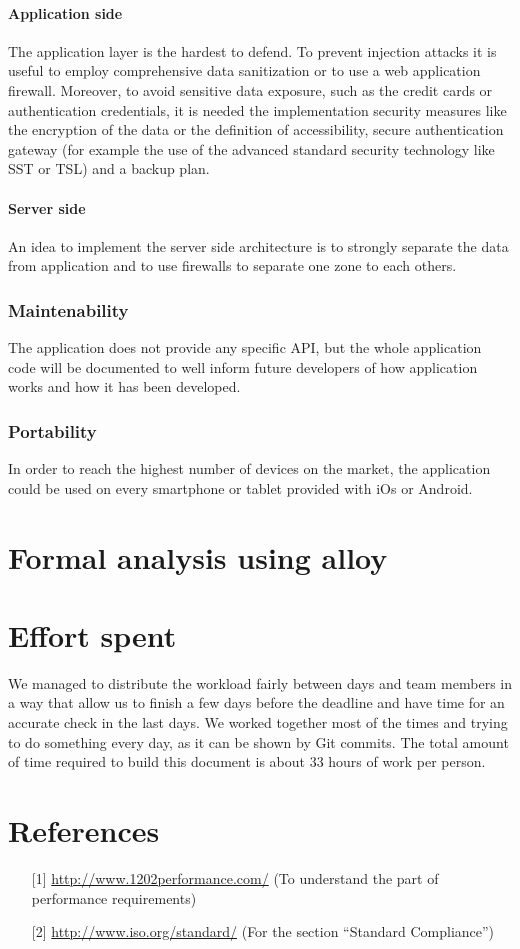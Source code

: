 \documentclass[12pt,titlepage]{article}
\begin{document}
\paragraph{Application side}
The application layer is the hardest to defend. To prevent injection attacks it is useful to employ comprehensive data sanitization or to use a web application firewall. Moreover, to avoid sensitive data exposure, such as the credit cards or authentication credentials, it is needed the implementation security measures like the encryption of the data or the definition of accessibility, secure authentication gateway (for example the use of the advanced standard security technology like SST or TSL) and a backup plan.

\paragraph{Server side}
An idea to implement the server side architecture is to strongly separate the data from application and to use firewalls to separate one zone to each others. 


\subsubsection{Maintenability}\label{sec:mod1}
The application does not provide any specific API, but the whole application code will be documented to well inform future developers of how application works and how it has been developed. 

\subsubsection{Portability}\label{sec:mod1}
In order to reach the highest number of devices on the market, the application could be used on every smartphone or tablet provided with iOs or Android. 
\pagebreak
\section{Formal analysis using alloy}\label{sec:crit}
\pagebreak
\section{Effort spent}\label{sec:crit}
We managed to distribute the workload fairly between days and team members in a way that allow us to finish a few days before the deadline and have time for an accurate check in the last days.
We worked together most of the times and trying to do something every day, as it can be shown by Git commits.
The total amount of time required to build this document is about 33 hours of work per person.
\pagebreak

\section{References}\label{sec:crit}
\begin{itemize}
\item [{[1]}] \url{http://www.1202performance.com/} (To understand the part of performance requirements)
\item [{[2]}] \url{http://www.iso.org/standard/} (For the section ``Standard Compliance'')
\end{itemize}
\end{document}
